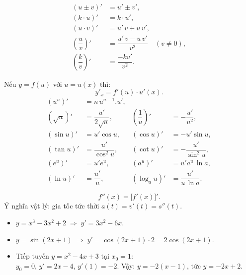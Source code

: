 \documentclass[12pt,a4paper]{article}
\begin{document}
\begin{congthuc}[title={Quy tắc tính đạo hàm}]
  \begin{align*}
    (u \pm v)' &= u' \pm v', \\
    (k \cdot u)' &= k \cdot u', \\
    (u \cdot v)' &= u'\,v + u\,v', \\[2pt]
    \left(\dfrac{u}{v}\right)' &= \dfrac{u'\,v - u\,v'}{v^2} \quad (v \ne 0), \\[4pt]
    \left(\dfrac{k}{v}\right)' &= \dfrac{-kv'}{v^2}.
  \end{align*}
\end{congthuc}

\begin{congthuc}[title={Đạo hàm hàm hợp}]
  Nếu $y = f(u)$ với $u = u(x)$ thì:
  \[
    y'_x = f'(u) \cdot u'(x).
  \]
  \begin{align*}
    (u^n)' &= n\,u^{n-1}.u', \\[2pt]
    (\sqrt{u})' &= \dfrac{u'}{2\sqrt{u}}, &
    \left(\dfrac{1}{u}\right)' &= -\dfrac{u'}{u^2}, \\[4pt]
    (\sin u)' &= u'\cos u, &
    (\cos u)' &= -u'\sin u, \\[2pt]
    (\tan u)' &= \dfrac{u'}{\cos^2 u}, &
    (\cot u)' &= -\dfrac{u'}{\sin^2 u}, \\[2pt]
    (e^u)' &= u'e^u, &
    (a^u)' &= u'a^u\,\ln a, \\[2pt]
    (\ln u)' &= \dfrac{u'}{u}, &
    (\log_a u)' &= \dfrac{u'}{u\,\ln a}.
  \end{align*}
\end{congthuc}

\begin{congthuc}[title={Đạo hàm cấp hai}]
  \[
    f''(x) = \bigl[f'(x)\bigr]'.
  \]
  Ý nghĩa vật lý: gia tốc tức thời $a(t) = v'(t) = s''(t)$.
\end{congthuc}

\begin{vidu}
  \begin{itemize}
    \item $y = x^3 - 3x^2 + 2 \;\Rightarrow\; y' = 3x^2 - 6x$.
    \item $y = \sin(2x + 1) \;\Rightarrow\; y' = \cos(2x + 1) \cdot 2 = 2\cos(2x + 1)$.
    \item Tiếp tuyến $y = x^2 - 4x + 3$ tại $x_0 = 1$: \\
      $y_0 = 0$, \;$y' = 2x - 4$, \;$y'(1) = -2$.
      Vậy: $y = -2(x - 1)$, tức $y = -2x + 2$.
  \end{itemize}
\end{vidu}
\end{document}
